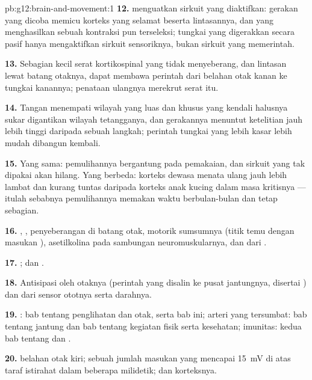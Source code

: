 \begin{solution}{pb:g12:brain-and-movement:1}
\textbf{12.}  menguatkan sirkuit yang diaktifkan: gerakan
yang dicoba memicu  korteks yang selamat beserta lintasannya, dan
yang menghasilkan sebuah kontraksi pun terseleksi; tungkai yang
digerakkan secara pasif hanya mengaktifkan sirkuit sensoriknya, bukan
sirkuit yang memerintah.

\textbf{13.} Sebagian kecil serat kortikospinal yang tidak menyeberang,
dan lintasan lewat batang otaknya, dapat membawa perintah dari belahan
otak kanan ke tungkai kanannya; penataan ulangnya merekrut serat itu.

\textbf{14.} Tangan menempati wilayah yang luas dan khusus yang kendali
halusnya sukar digantikan wilayah tetangganya, dan gerakannya menuntut
ketelitian jauh lebih tinggi daripada sebuah langkah; perintah tungkai
yang lebih kasar lebih mudah dibangun kembali.

\textbf{15.} Yang sama: pemulihannya bergantung pada pemakaian, dan
sirkuit yang tak dipakai akan hilang. Yang berbeda: korteks dewasa
menata ulang jauh lebih lambat dan kurang tuntas daripada korteks anak
kucing dalam masa kritisnya --- itulah sebabnya pemulihannya memakan
waktu berbulan-bulan dan tetap sebagian.

\textbf{16.} , , penyeberangan di
batang otak,  motorik sumsumnya (titik temu dengan masukan
), asetilkolina pada sambungan neuromuskularnya, dan  dari
 .

\textbf{17.} ; dan .

\textbf{18.} Antisipasi oleh otaknya (perintah yang disalin ke pusat
jantungnya, disertai ) dan  dari sensor ototnya
serta darahnya.

\textbf{19.} : bab tentang penglihatan dan otak, serta bab
ini; arteri yang tersumbat: bab tentang jantung dan bab tentang
kegiatan fisik serta kesehatan; imunitas: kedua bab tentang  dan .

\textbf{20.}  belahan otak kiri; sebuah jumlah
masukan yang mencapai \qty{15}{mV} di atas taraf istirahat dalam
beberapa milidetik; dan  korteksnya.
\end{solution}
